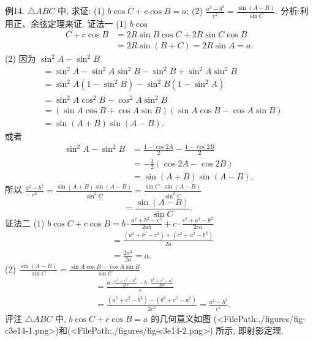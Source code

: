 例14. $\triangle A B C$ 中, 求证:
(1) $b \cos C+c \cos B=a$;
(2) $\frac{a^2-b^2}{c^2}=\frac{\sin (A-B)}{\sin C}$.
分析:利用正、余弦定理来证.
证法一
(1) $b \cos$
$$
\begin{aligned}
C+c \cos B & =2 R \sin B \cos C+2 R \sin C \cos B \\
& =2 R \sin (B+C)=2 R \sin A=a .
\end{aligned}
$$
(2) 因为 $\sin ^2 A-\sin ^2 B$
$$
\begin{aligned}
& =\sin ^2 A-\sin ^2 A \sin ^2 B-\sin ^2 B+\sin ^2 A \sin ^2 B \\
& =\sin ^2 A\left(1-\sin ^2 B\right)-\sin ^2 B\left(1-\sin ^2 A\right) \\
& =\sin ^2 A \cos ^2 B-\cos ^2 A \sin ^2 B \\
& =(\sin A \cos B+\cos A \sin B)(\sin A \cos B-\cos A \sin B) \\
& =\sin (A+B) \sin (A-B) .
\end{aligned}
$$
或者
$$
\begin{aligned}
\sin ^2 A-\sin ^2 B & =\frac{1-\cos 2 A}{2}-\frac{1-\cos 2 B}{2} \\
& =-\frac{1}{2}(\cos 2 A-\cos 2 B) \\
& =\sin (A+B) \sin (A-B),
\end{aligned}
$$
所以 $\frac{a^2-b^2}{c^2}=\frac{\sin (A+B) \sin (A-B)}{\sin ^2 C}=\frac{\sin C \cdot \sin (A-B)}{\sin ^2 C}$
$$
=\frac{\sin (A-B)}{\sin C} \text {. }
$$
证法二 (1) $b \cos C+c \cos B=b \cdot \frac{a^2+b^2-c^2}{2 a b}+c \cdot \frac{c^2+a^2-b^2}{2 c a}$
$$
\begin{aligned}
& =\frac{\left(a^2+b^2-c^2\right)+\left(c^2+a^2-b^2\right)}{2 a} \\
& =\frac{2 a^2}{2 a}=a .
\end{aligned}
$$
(2) $\frac{\sin (A-B)}{\sin C}=\frac{\sin A \cos B-\cos A \sin B}{\sin C}$
$$
\begin{aligned}
& =\frac{a \cdot \frac{a^2+c^2-b^2}{2 a c}-b \cdot \frac{b^2+c^2-a^2}{2 b c}}{c} \\
& =\frac{\left(a^2+c^2-b^2\right)-\left(b^2+c^2-a^2\right)}{2 c^2}=\frac{a^2-b^2}{c^2} .
\end{aligned}
$$
评注 $\triangle A B C$ 中, $b \cos C+c \cos B=a$ 的几何意义如图 (<FilePath:./figures/fig-c3e14-1.png>)和(<FilePath:./figures/fig-c3e14-2.png>) 所示, 即射影定理.



